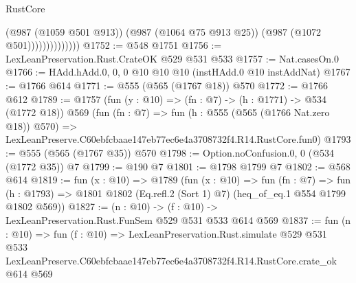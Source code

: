 \begin{lexlean}{RustCore}
\begin{coremodule}
                            (@987 (@1059 @501 @913))
                            (@987 (@1064 @75 @913 @25))
                            (@987 (@1072 @501))))))))))))))
@1752 := @548 @1751
@1756 := LexLeanPreservation.Rust.CrateOK @529 @531 @533
@1757 := Nat.casesOn.{0}
@1766 := HAdd.hAdd.{0, 0, 0} @10 @10 @10 (instHAdd.{0} @10 instAddNat)
@1767 := @1766 @614
@1771 := @555 (@565 (@1767 @18)) @570
@1772 := @1766 @612
@1789 := @1757
    (fun (y : @10) => (fn : @7) -> (h : @1771) -> @534 (@1772 @18))
    @569
    (fun (fn : @7) =>
    fun (h : @555 (@565 (@1766 Nat.zero @18)) @570) =>
    LexLeanPreserve.C60ebfcbaae147eb77ec6e4a3708732f4.R14.RustCore.fun0)
@1793 := @555 (@565 (@1767 @35)) @570
@1798 := Option.noConfusion.{0, 0} (@534 (@1772 @35)) @7
@1799 := @190 @7
@1801 := @1798 @1799 @7
@1802 := @568 @614
@1819 := fun (x : @10) =>
  @1789
    (fun (x : @10) =>
    fun (fn : @7) =>
    fun (h : @1793) => @1801 @1802 (Eq.refl.{2} (Sort 1) @7) (heq_of_eq.{1} @554 @1799 @1802 @569))
@1827 := (n : @10) -> (f : @10) -> LexLeanPreservation.Rust.FunSem @529 @531 @533 @614 @569
@1837 := fun (n : @10) =>
  fun (f : @10) =>
  LexLeanPreservation.Rust.simulate
    @529
    @531
    @533
    LexLeanPreserve.C60ebfcbaae147eb77ec6e4a3708732f4.R14.RustCore.crate_ok
    @614
    @569
\end{coremodule}
\end{lexlean}
